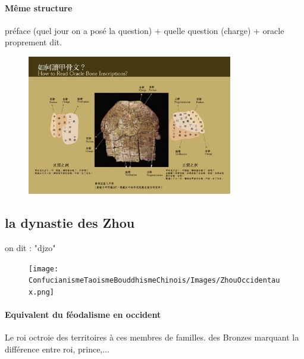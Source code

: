 \paragraph{Même structure} préface (quel jour on a posé la question) + quelle question (charge) + oracle proprement dit. 
\begin{figure}[!h]
    \centering
\includegraphics[width=0.8\textwidth]{ConfucianismeTaoismeBouddhismeChinois/Images/ReadOracle.jpg}

    \label{fig:enter-label}
\end{figure}

\subsection{la dynastie des Zhou}
on dit : "djzo"
\begin{figure}[!h]
    \centering
\texttt{[image: ConfucianismeTaoismeBouddhismeChinois/Images/ZhouOccidentaux.png]}

    \label{fig:enter-label}
\end{figure}

\paragraph{Equivalent du féodalisme en occident} Le roi octroie des territoires à ces membres de familles.  des Bronzes marquant la différence entre roi, prince,...


